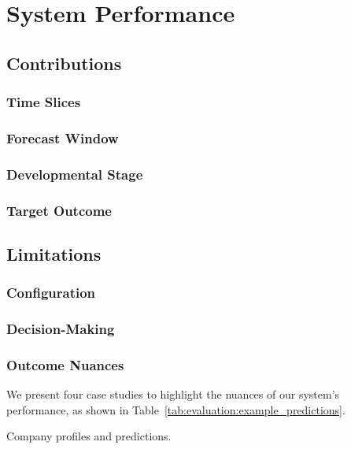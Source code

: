 \documentclass[../thesis/thesis.tex]{subfiles}
\begin{document}
\section{System Performance} %

\subsection{Contributions} %

\subsubsection{Time Slices} %
\subsubsection{Forecast Window} %
\subsubsection{Developmental Stage} %
\subsubsection{Target Outcome} %

\subsection{Limitations} %

\subsubsection{Configuration} %
\subsubsection{Decision-Making} %
\subsubsection{Outcome Nuances}

We present four case studies to highlight the nuances of our system's performance, as shown in Table~\ref{tab:evaluation:example_predictions}.

\begin{table}[!htb]
    \centering
    \scalebox{0.9}{}
    \caption[Company profiles and predictions]{Company profiles and predictions.}
    \label{tab:evaluation:example_predictions}
\end{table}
\end{document}

